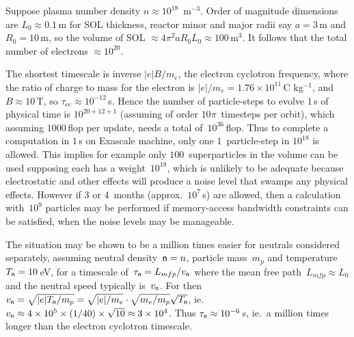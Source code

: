 
Suppose plasma number density $n \approx 10^{18}$\, m$^{-3}$. Order of magnitude
dimensions are $L_0\approx0.1$\,m for SOL thickness, reactor minor and major radii
say $a=3$\,m and $R_0=10$\,m, so the volume of SOL $\approx 4 \pi^2 a R_0 L_0 \approx 100$\,m$^3$.
It follows that the total number of electrons $\approx 10^{20}$.

The shortest timescale is inverse $|e| B/m_e$, the electron cyclotron frequency, where the
ratio of charge to mass for the electron is
$|e|/m_e = 1.76 \times 10^{11}$\,C kg$^{-1}$, and $B\approx 10$\,T, so $\tau_{ce}\approx 10^{-12}$\,s.
Hence the number of particle-steps to evolve $1$\,s of physical time is  $10^{20+12+1}$
(assuming of order $10\pi$~timesteps per orbit),
which assuming $1000$\,flop per update, needs a total of~$10^{36}$\,flop.
Thus to complete a computation in $1$\,s on Exascale machine, only one
$1$~particle-step in $10^{18}$ is allowed.
This implies for example only $100$~superparticles in the volume can be used supposing
each has a weight~$10^{18}$, which
is unlikely to be adequate because electrostatic and other effects will produce a noise level
that swamps any physical effects. However if $3$ or $4$~months (approx.~$10^7$\,s) are allowed, then
a calculation with~$10^9$ particles may be performed if memory-access bandwidth constraints
can be satisfied, when the noise levels may be manageable.

The situation may be shown to be a million times easier for neutrals considered
separately, assuming neutral density~${\sf n}=n$, particle mass~$m_p$ and temperature~$T_{\sf n}=10$\,eV, for a
timescale of~$\tau_{\sf n}=L_{mfp}/v_{\sf n}$ where the mean free path~$L_{mfp}\approx L_0$ and the neutral
speed typically is~$v_{\sf n}$. For then $v_{\sf n}=\sqrt{|e|T_{\sf n}/m_p}
=\sqrt{|e|/m_e} \cdot \sqrt{m_e/m_p} \sqrt{T_{\sf n}}$, ie.\ 
$v_{\sf n}\approx 4 \times 10^5 \times (1/40) \times \sqrt{10}\approx 3 \times 10^4$. Thus
$\tau_{\sf n}\approx 10^{-6}$\,s, ie.\  a million times longer than the electron cyclotron timescale.

